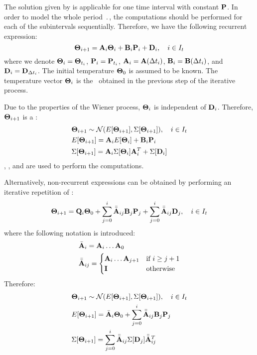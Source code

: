 The solution given by  is applicable for one time interval with constant $\mathbf{P}$. In order to model the whole period $\period$, the computations should be performed for each of the subintervals sequentially. Therefore, we have the following recurrent expression:
\begin{equation} \equlabel{fourier-recurrence-noise}
  \vtemperature_{i + 1} = \m{A}_i \vtemperature_i + \m{B}_i \vpower_i + \m{D}_i, \sep i \in \timeindex
\end{equation}
where we denote $\mathbf{\Theta}_i = \mathbf{\Theta}_{t_i}$, $\mathbf{P}_i = \mathbf{P}_{t_i}$, $\mathbf{A}_i = \mathbf{A}(\Delta t_i)$, $\mathbf{B}_i = \mathbf{B}(\Delta t_i)$, and $\mathbf{D}_i = \mathbf{D}_{\Delta t_i}$. The initial temperature $\mathbf{\Theta}_0$ is assumed to be known. The temperature vector $\mathbf{\Theta}_i$ is the \mnrv\ obtained in the previous step of the iterative process.

Due to the properties of the Wiener process, $\mathbf{\Theta}_i$ is independent of $\mathbf{D}_i$. Therefore, $\mathbf{\Theta}_{i+1}$ is a \mnrv:
\begin{align*}
  & \mathbf{\Theta}_{i + 1} \sim \mathcal{N}(E[\mathbf{\Theta}_{i + 1}], \Sigma[\mathbf{\Theta}_{i + 1}]), \hspace{10pt} i \in I_t \\
  & E[\mathbf{\Theta}_{i+1}] = \mathbf{A}_i E[\mathbf{\Theta}_i] + \mathbf{B}_i \mathbf{P}_i \\
  & \Sigma[\mathbf{\Theta}_{i+1}] = \mathbf{A}_i \Sigma[\mathbf{\Theta}_i] \mathbf{A}^T_i + \Sigma[\mathbf{D}_i]
\end{align*}
, , and  are used to perform the computations.

Alternatively, non-recurrent expressions can be obtained by performing an iterative repetition of :
\begin{equation*}
  \mathbf{\Theta}_{i + 1} = \mathbf{Q}_i \mathbf{\Theta}_0 + \sum_{j = 0}^{i} \Bar{\Bar{\mathbf{A}}}_{ij} \mathbf{B}_j \mathbf{P}_j + \sum_{j = 0}^{i} \Bar{\Bar{\mathbf{A}}}_{ij} \mathbf{D}_j, \hspace{10pt} i \in I_t
\end{equation*}
where the following notation is introduced:
\begin{align*}
  & \Bar{\mathbf{A}}_i = \mathbf{A}_i \dots \mathbf{A}_0 \\
  & \Bar{\Bar{\mathbf{A}}}_{ij} = \begin{cases}
    \mathbf{A}_i \dots \mathbf{A}_{j + 1} & \mbox{if } i \geq j + 1 \\
    \mathbf{I} & \mbox{otherwise}
  \end{cases}
\end{align*}
Therefore:
\begin{align*}
  & \mathbf{\Theta}_{i + 1} \sim \mathcal{N}(E[\mathbf{\Theta}_{i + 1}], \Sigma[\mathbf{\Theta}_{i + 1}]), \hspace{10pt} i \in I_t \\
  & E[\mathbf{\Theta}_{i + 1}] = \Bar{\mathbf{A}}_i \mathbf{\Theta}_0 + \sum_{j = 0}^{i} \Bar{\Bar{\mathbf{A}}}_{ij} \mathbf{B}_j \mathbf{P}_j \\
  & \Sigma[\mathbf{\Theta}_{i + 1}] = \sum_{j = 0}^{i} \Bar{\Bar{\mathbf{A}}}_{ij} \Sigma[\mathbf{D}_j] \Bar{\Bar{\mathbf{A}}}_{ij}^T
\end{align*}
